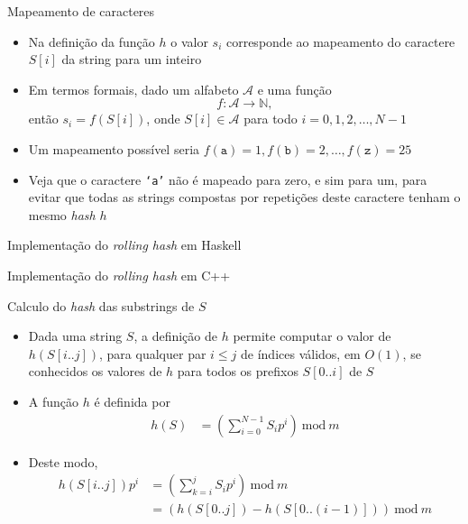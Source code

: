 \begin{frame}[fragile]{Mapeamento de caracteres}

    \begin{itemize}
        \item Na definição da função $h$ o valor $s_i$ corresponde ao mapeamento do caractere
        $S[i]$ da string para um inteiro

        \item Em termos formais, dado um alfabeto $\mathcal{A}$ e uma função
        \[
            f : \mathcal{A} \to \mathbb{N},
        \]
        então $s_i = f(S[i])$, onde $S[i]\in\mathcal{A}$ para todo $i = 0, 1, 2, \ldots, N - 1$

        \item Um mapeamento possível seria $f(\mathtt{a}) = 1, f(\mathtt{b}) = 2, \ldots,
        f(\mathtt{z}) = 25$

        \item Veja que o caractere \texttt{`a'} não é mapeado para zero, e sim para um, para
            evitar que todas as strings compostas por repetições deste caractere tenham o 
            mesmo \textit{hash} $h$
    \end{itemize}

\end{frame}

\begin{frame}[fragile]{Implementação do {\it rolling hash} em Haskell}
\end{frame}

\begin{frame}[fragile]{Implementação do {\it rolling hash} em C++}
\end{frame}

\begin{frame}[fragile]{Calculo do {\it hash} das substrings de $S$}

    \begin{itemize}
        \item Dada uma string $S$, a definição de $h$ permite computar o valor de $h(S[i..j])$,
            para qualquer par $i\leq j$ de índices válidos, em $O(1)$, se conhecidos os valores
            de $h$ para todos os prefixos $S[0..i]$ de $S$
        
        \item A função $h$ é definida por
        \begin{align*}
        h(S) &= \left(\sum_{i=0}^{N - 1} S_ip^i\right)\ \mbox{mod}\ m
        \end{align*}

        \item Deste modo,
        \begin{align*}
        h(S[i..j])p^i &= \left(\sum_{k=i}^{j} S_ip^i\right)\ \mbox{mod}\ m \\
        &= \left(h(S[0..j]) - h(S[0..(i - 1)])\right) \ \mbox{mod}\ m
        \end{align*}
    \end{itemize}

\end{frame}

